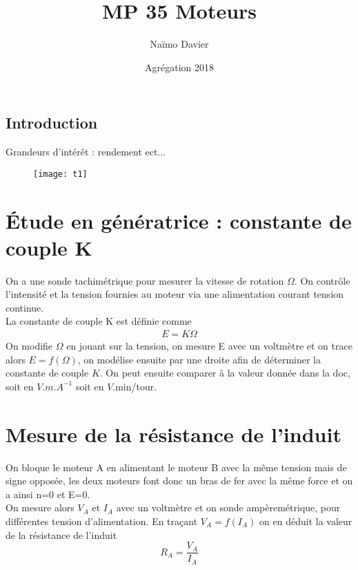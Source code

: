 \documentclass[12pt,prb,aps,epsf]{article}
\begin{document}
	
	\title{MP 35 Moteurs}
		\author{Naïmo Davier}
		\date{Agrégation 2018}
	
	\maketitle
	
	\tableofcontents
	
	\pagebreak
	
	\subsection{Introduction}
	Grandeurs d'intérêt : rendement ect...
	
\begin{figure}[h]
	\centering \texttt{[image: t1]}
\end{figure}
	
\section{Étude en génératrice : constante de couple K}
On a une sonde tachimétrique pour mesurer la vitesse de rotation $\Omega$. On contrôle l'intensité et la tension fournies au moteur via une alimentation courant tension continue. \\
La constante de couple K est définie comme 
\begin{eqnarray}
E = K\Omega
\end{eqnarray}
On modifie $\Omega$ en jouant sur la tension, on mesure E avec un voltmètre et on trace alors $E=f(\Omega)$, on modélise ensuite par une droite afin de déterminer la constante de couple $K$. On peut ensuite comparer à la valeur donnée dans la doc, soit en $V.m.A^{-1}$ soit en $V.$min/tour.

\section{Mesure de la résistance de l'induit}
On bloque le moteur A en alimentant le moteur B avec la même tension mais de signe opposée, les deux moteurs font donc un bras de fer avec la même force et on a ainsi n=0 et E=0.\\
On mesure alors $V_A$ et $I_A$ avec un voltmètre et on sonde ampèremétrique, pour différentes tension d'alimentation. En traçant $V_A=f(I_A)$ on en déduit la valeur de la résistance de l'induit
\begin{equation}
R_A = \frac{V_A}{I_A}
\end{equation}
\end{document}
